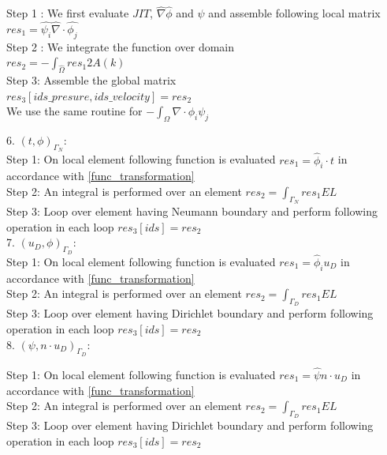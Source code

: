 \documentclass[a4paper,12pt]{book}
\begin{document}
Step 1 : We first evaluate $JIT$, $\hat{\nabla} \hat{\phi}$ and $\psi$ and assemble following local matrix\\
$res_1 = \hat{\psi_i} \hat{\nabla} \cdot \hat{\phi_j}$\\

Step 2 : We integrate the function over domain\\
$res_2 = -\int_{\hat{\Omega}} res_1 2 A(k)$\\

Step 3: Assemble the global matrix\\
$res_3[ids\_presure,ids\_velocity] = res_2$\\

We use the same routine for $-\int_{\Omega} \nabla \cdot \phi_i \psi_j $

6. $(t,\phi)_{\Gamma_N}$:
\\

Step 1: On local element following function is evaluated $res_1=\hat{\phi}_i \cdot t$ in accordance with \ref{func_transformation}\\
Step 2: An integral is performed over an element $res_2=\int_{\Gamma_N} res_1 EL $\\
Step 3: Loop over element having Neumann boundary and perform following operation in each loop $res_3[ids]=res_2$\\

7. $(u_D,\phi)_{\Gamma_D}$:
\\

Step 1: On local element following function is evaluated $res_1=\hat{\phi}_i u_D$ in accordance with \ref{func_transformation}\\
Step 2: An integral is performed over an element $res_2=\int_{\Gamma_D} res_1 EL $\\
Step 3: Loop over element having Dirichlet boundary and perform following operation in each loop $res_3[ids]=res_2$\\

8. $(\psi, n \cdot u_D)_{\Gamma_D} $:

Step 1: On local element following function is evaluated $res_1=\hat{\psi} n\cdot u_D$ in accordance with \ref{func_transformation}\\
Step 2: An integral is performed over an element $res_2=\int_{\Gamma_D} res_1 EL $\\
Step 3: Loop over element having Dirichlet boundary and perform following operation in each loop $res_3[ids]=res_2$\\
\end{document}
